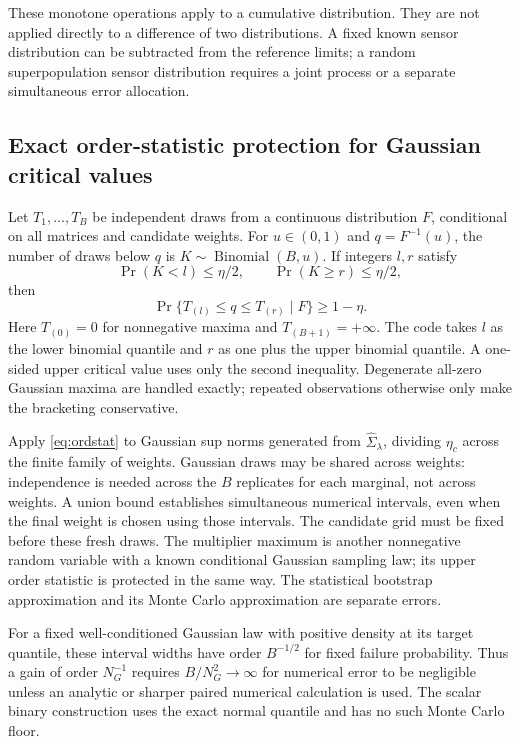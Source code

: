 These monotone operations apply to a cumulative distribution. They are not applied directly to a difference of two distributions. A fixed known sensor distribution can be subtracted from the reference limits; a random superpopulation sensor distribution requires a joint process or a separate simultaneous error allocation.

\subsection{Exact order-statistic protection for Gaussian critical values}
Let $T_1,\ldots,T_B$ be independent draws from a continuous distribution $F$, conditional on all matrices and candidate weights. For $u\in(0,1)$ and $q=F^{-1}(u)$, the number of draws below $q$ is $K\sim\operatorname{Binomial}(B,u)$. If integers $l,r$ satisfy
\[
 \Pr(K<l)\leq\eta/2,\qquad\Pr(K\geq r)\leq\eta/2,
\]
then
\begin{equation}\label{eq:ordstat}
 \Pr\{T_{(l)}\leq q\leq T_{(r)}\mid F\}\geq1-\eta.
\end{equation}
Here $T_{(0)}=0$ for nonnegative maxima and $T_{(B+1)}=+\infty$. The code takes $l$ as the lower binomial quantile and $r$ as one plus the upper binomial quantile. A one-sided upper critical value uses only the second inequality. Degenerate all-zero Gaussian maxima are handled exactly; repeated observations otherwise only make the bracketing conservative.

Apply \eqref{eq:ordstat} to Gaussian sup norms generated from $\widehat\Sigma_\lambda$, dividing $\eta_c$ across the finite family of weights. Gaussian draws may be shared across weights: independence is needed across the $B$ replicates for each marginal, not across weights. A union bound establishes simultaneous numerical intervals, even when the final weight is chosen using those intervals. The candidate grid must be fixed before these fresh draws. The multiplier maximum is another nonnegative random variable with a known conditional Gaussian sampling law; its upper order statistic is protected in the same way. The statistical bootstrap approximation and its Monte Carlo approximation are separate errors.

For a fixed well-conditioned Gaussian law with positive density at its target quantile, these interval widths have order $B^{-1/2}$ for fixed failure probability. Thus a gain of order $N_G^{-1}$ requires $B/N_G^2\to\infty$ for numerical error to be negligible unless an analytic or sharper paired numerical calculation is used. The scalar binary construction uses the exact normal quantile and has no such Monte Carlo floor.

